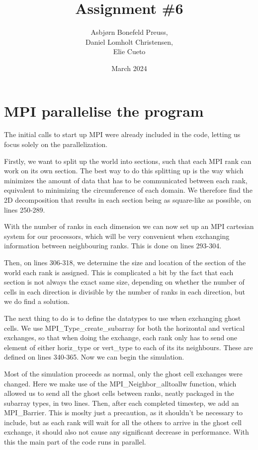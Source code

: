 \documentclass{article}
\title{Assignment \#6}
\author{Asbjørn Bonefeld Preuss,\\ Daniel Lomholt Christensen,\\ Elie Cueto}
\date{March 2024}
\begin{document}
\maketitle
\section{MPI parallelise the program}
The initial calls to start up MPI were already included in the code, letting us focus solely on the parallelization. 

Firstly, we want to split up the world into sections, such that each MPI rank can work on its own section. The best way to do this splitting up is the way which minimizes the amount of data that has to be communicated between each rank, equivalent to minimizing the circumference of each domain. We therefore find the 2D decomposition that results in each section being as square-like as possible, on lines 250-289.

With the number of ranks in each dimension we can now set up an MPI cartesian system for our processors, which will be very convenient when exchanging information between neighbouring ranks. This is done on lines 293-304. 

Then, on lines 306-318, we determine the size and location of the section of the world each rank is assigned. This is complicated a bit by the fact that each section is not always the exact same size, depending on whether the number of cells in each direction is divisible by the number of ranks in each direction, but we do find a solution.

The next thing to do is to define the datatypes to use when exchanging ghost cells. We use MPI\_Type\_create\_subarray for both the horizontal and vertical exchanges, so that when doing the exchange, each rank only has to send one element of either horiz\_type or vert\_type to each of its its neighbours. These are defined on lines 340-365. Now we can begin the simulation.

Most of the simulation proceeds as normal, only the ghost cell exchanges were changed. Here we make use of the MPI\_Neighbor\_alltoallw function, which allowed us to send all the ghost cells between ranks, neatly packaged in the subarray types, in two lines. Then, after each completed timestep, we add an MPI\_Barrier.  This is moslty just a precaution, as it shouldn't be necessary to include, but as each rank will wait for all the others to arrive in the ghost cell exchange, it should also not cause any significant decrease in performance. With this the main part of the code runs in parallel. 
\end{document}
